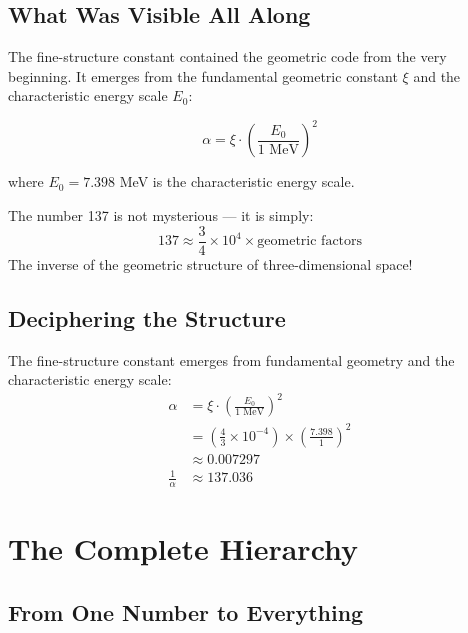 	\subsection{What Was Visible All Along}
	
	The fine-structure constant contained the geometric code from the very beginning. It emerges from the fundamental geometric constant $\xi$ and the characteristic energy scale $E_0$:
	
	\begin{equation}
		\alpha = \xi \cdot \left(\frac{E_0}{1 \text{ MeV}}\right)^2
	\end{equation}
	
	where $E_0 = 7.398$ MeV is the characteristic energy scale.
	
	\begin{tcolorbox}[colback=blue!5!white,colframe=blue!75!black,title=Insight]
		The number 137 is not mysterious — it is simply:
		\begin{equation}
			137 \approx \frac{3}{4} \times 10^4 \times \text{geometric factors}
		\end{equation}
		The inverse of the geometric structure of three-dimensional space!
	\end{tcolorbox}
	
	\subsection{Deciphering the Structure}
	
	\begin{tcolorbox}[colback=red!5!white,colframe=red!75!black,title=The Complete Deciphering]
		The fine-structure constant emerges from fundamental geometry and the characteristic energy scale:
		\begin{align}
			\alpha &= \xi \cdot \left(\frac{E_0}{1 \text{ MeV}}\right)^2 \\
			&= \left(\frac{4}{3} \times 10^{-4}\right) \times \left(\frac{7.398}{1}\right)^2 \\
			&\approx 0.007297 \\
			\frac{1}{\alpha} &\approx 137.036
		\end{align}
	\end{tcolorbox}
	
	\section{The Complete Hierarchy}
	
	\subsection{From One Number to Everything}
	
